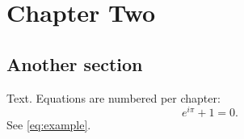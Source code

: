 \chapter{Chapter Two}\label{ch:two}

\section{Another section}

Text. Equations are numbered per chapter:
\begin{equation}\label{eq:example}
  e^{i\pi} + 1 = 0.
\end{equation}
See \eqref{eq:example}.

